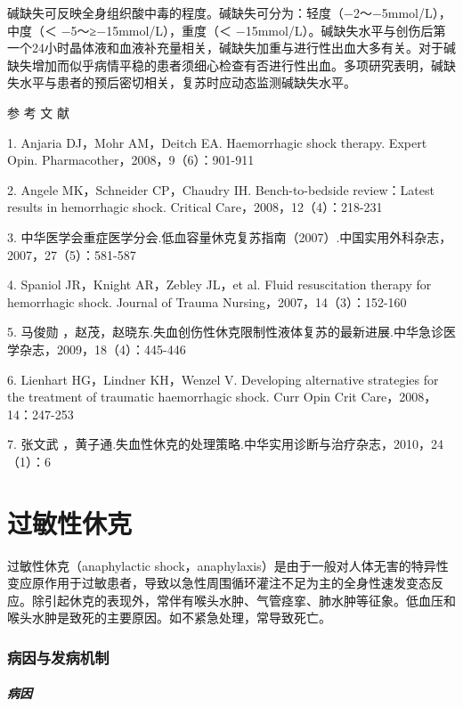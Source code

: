 碱缺失可反映全身组织酸中毒的程度。碱缺失可分为：轻度（−2～−5mmol/L），中度（＜
−5～≥−15mmol/L），重度（＜
−15mmol/L）。碱缺失水平与创伤后第一个24小时晶体液和血液补充量相关，碱缺失加重与进行性出血大多有关。对于碱缺失增加而似乎病情平稳的患者须细心检查有否进行性出血。多项研究表明，碱缺失水平与患者的预后密切相关，复苏时应动态监测碱缺失水平。

\protect\hypertarget{text00062.html}{}{}

\hypertarget{text00062.htmlux5cux23CHP2-4-4}{}
参 考 文 献

1. Anjaria DJ，Mohr AM，Deitch EA. Haemorrhagic shock therapy. Expert
Opin. Pharmacother，2008，9（6）：901-911

2. Angele MK，Schneider CP，Chaudry IH. Bench-to-bedside review：Latest
results in hemorrhagic shock. Critical Care，2008，12（4）：218-231

3.
中华医学会重症医学分会.低血容量休克复苏指南（2007）.中国实用外科杂志，2007，27（5）：581-587

4. Spaniol JR，Knight AR，Zebley JL，et al. Fluid resuscitation therapy
for hemorrhagic shock. Journal of Trauma Nursing，2007，14（3）：152-160

5. 马俊勋
，赵茂，赵晓东.失血创伤性休克限制性液体复苏的最新进展.中华急诊医学杂志，2009，18（4）：445-446

6. Lienhart HG，Lindner KH，Wenzel V. Developing alternative strategies
for the treatment of traumatic haemorrhagic shock. Curr Opin Crit
Care，2008，14：247-253

7. 张文武
，黄子通.失血性休克的处理策略.中华实用诊断与治疗杂志，2010，24（1）：6

\protect\hypertarget{text00063.html}{}{}

\chapter{过敏性休克}

过敏性休克（anaphylactic
shock，anaphylaxis）是由于一般对人体无害的特异性变应原作用于过敏患者，导致以急性周围循环灌注不足为主的全身性速发变态反应。除引起休克的表现外，常伴有喉头水肿、气管痉挛、肺水肿等征象。低血压和喉头水肿是致死的主要原因。如不紧急处理，常导致死亡。

\subsection{病因与发病机制}

\paragraph{病因}

